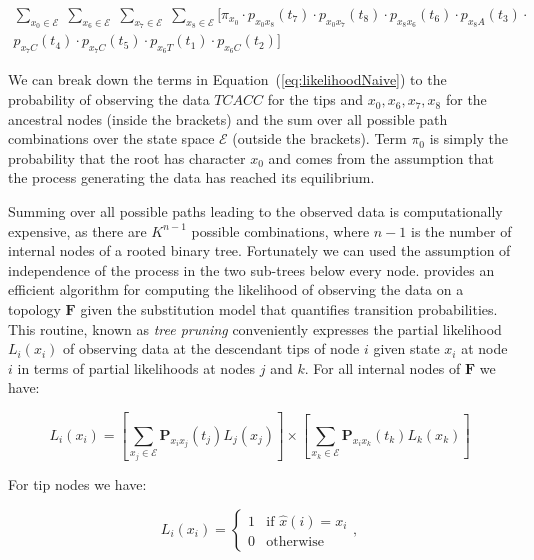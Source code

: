 \begin{eqnarray}
\underset{x_{0}\in \mathcal{E}}{\sum}\;\underset{x_{6}\in \mathcal{E}}{\sum}\;\underset{x_{7}\in \mathcal{E}}{\sum}\;\underset{x_{8}\in \mathcal{E}}{\sum}[\pi_{x_{0}}\cdot p_{x_{0}x_{8}}(t_{7})\cdot p_{x_{0}x_{7}}(t_{8})\cdot p_{x_{8}x_{6}}(t_{6})\cdot p_{x_{8}A}(t_{3}) \cdot \\ \nonumber
p_{x_{7}C}(t_{4})\cdot p_{x_{7}C}(t_{5})\cdot p_{x_{6}T}(t_{1})\cdot p_{x_{6}C}(t_{2})]
\label{eq:likelihoodNaive}
\end{eqnarray}

We can break down the terms in Equation~(\ref{eq:likelihoodNaive}) to the probability of observing the data $TCACC$ for the tips and $x_{0},x_{6},x_{7},x_{8}$ for the ancestral nodes (inside the brackets) and the sum over all possible path combinations over the state space $\mathcal{E}$ (outside the brackets).
Term $\pi_{0}$ is simply the probability that the root has character $x_{0}$ and comes from the assumption that the process generating the data has reached its equilibrium.

Summing over all possible paths leading to the observed data is computationally expensive, as there are  $K^{n-1}$ possible combinations, where $n-1$ is the number of internal nodes of a rooted binary tree.
Fortunately we can used the assumption of independence of the process in the two sub-trees below every node.
\citet{Felsenstein1981} provides an efficient algorithm for computing the likelihood of observing the data on a topology $\mathbf{F}$ given the substitution model that quantifies transition probabilities.
This routine, known as \emph{tree pruning} conveniently expresses the partial likelihood $L_{i}(x_{i})$ of observing data at the descendant tips of node $i$ given state $x_{i}$ at node $i$ in terms of partial likelihoods at nodes $j$ and $k$.
For all internal nodes of $\mathbf{F}$ we have:

\begin{equation}
L_{i}(x_{i})=\left[\underset{x_{j}\in \mathcal{E}}{\sum}\mathbf{P}_{x_{i}x_{j}}(t_{j})L_{j}(x_{j})\right]\times\left[\underset{x_{k}\in \mathcal{E}}{\sum}\mathbf{P}_{x_{i}x_{k}}(t_{k})L_{k}(x_{k})\right]
\label{eq:felsenstein1}
\end{equation}

\noindent
For tip nodes we have:

\begin{equation}
L_{i}(x_{i})=\begin{cases}
1 & \text{if }\hat{x}(i)=x_{i}\\
0 & \text{otherwise}
\end{cases},
\label{eq:felsenstein2}
\end{equation}

